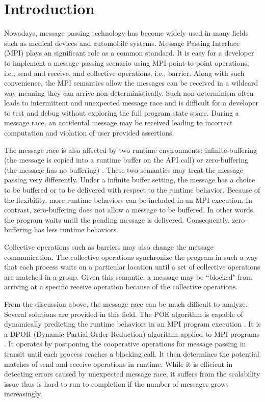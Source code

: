 \section{Introduction}
Nowadays, message passing technology has become widely used in many fields such as medical devices and automobile systems. Message Passing Interface (MPI) plays an significant role as a common standard. It is easy for a developer to implement a message passing scenario using MPI point-to-point operations, i.e., send and receive, and collective operations, i.e., barrier. Along with such convenience, the MPI semantics allow the messages can be received in a wildcard way meaning they can arrive non-deterministically. Such non-determinism often leads to intermittent and unexpected message race and is difficult for a developer to test and debug without exploring the full program state space. During a message race, an accidental message may be received leading to incorrect computation and violation of user provided assertions. 

The message race is also affected by two runtime environments: infinite-buffering (the message is copied into a runtime buffer on the API call) or zero-buffering (the message has no buffering) \cite{}. These two semantics may treat the message passing very differently. Under a infinite buffer setting, the message has a choice to be buffered or to be delivered with respect to the runtime behavior. Because of the flexibility, more runtime behaviors can be included in an MPI execution. In contrast, zero-buffering does not allow a message to be buffered. In other words, the program waits until the pending message is delivered. Consequently, zero-buffering has less runtime behaviors.

Collective operations such as barriers may also change the message communication. The collective operations synchronize the program in such a way that each process waits on a particular location until a set of collective operations are matched in a group. Given this semantic, a message may be ``blocked" from arriving at a specific receive operation because of the collective operations. 


From the discussion above, the message race can be much difficult to analyze. Several solutions are provided in this field. The POE algorithm is capable of dynamically predicting the runtime behaviors in an MPI program execution \cite{}. It is a DPOR (Dynamic Partial Order Reduction) algorithm applied to MPI programs \cite{}. It operates by postponing the cooperative operations for message passing in transit until each process reaches a blocking call. It then determines the potential matches of send and receive operations in runtime. While it is efficient in detecting errors caused by unexpected message race, it suffers from the scalability issue thus is hard to run to completion if the number of messages grows increasingly. 

